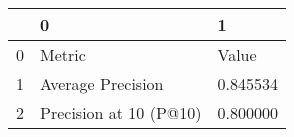 \begin{tabular}{lll}
\toprule
 & 0 & 1 \\
\midrule
0 & Metric & Value \\
1 & Average Precision & 0.845534 \\
2 & Precision at 10 (P@10) & 0.800000 \\
\bottomrule
\end{tabular}
